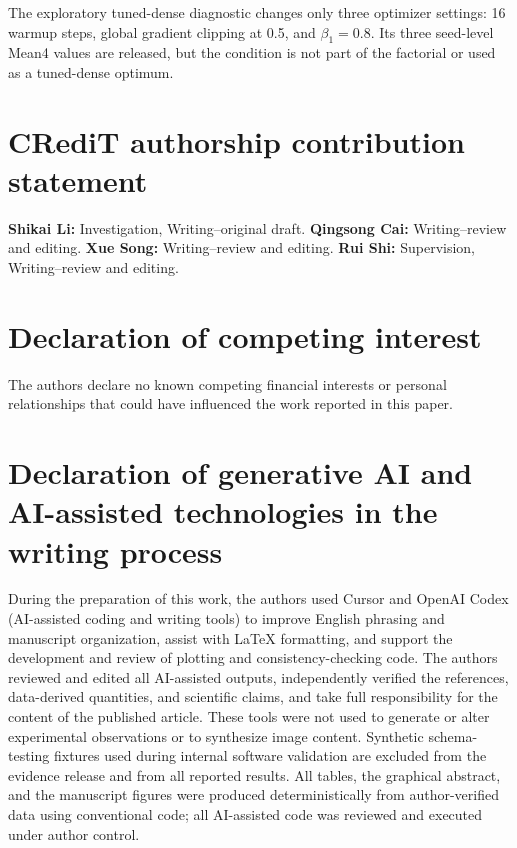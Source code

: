 \documentclass[5p,times]{elsarticle}
\begin{document}
The exploratory tuned-dense diagnostic changes only three optimizer settings:
16 warmup steps, global gradient clipping at 0.5, and $\beta_1=0.8$. Its
three seed-level Mean4 values are released, but the condition is not part of the
factorial or used as a tuned-dense optimum.

\section*{CRediT authorship contribution statement}
\textbf{Shikai Li:} Investigation, Writing--original draft.
\textbf{Qingsong Cai:} Writing--review and editing.
\textbf{Xue Song:} Writing--review and editing.
\textbf{Rui Shi:} Supervision, Writing--review and editing.

\section*{Declaration of competing interest}
The authors declare no known competing financial interests or personal
relationships that could have influenced the work reported in this paper.

\section*{Declaration of generative AI and AI-assisted technologies in the writing process}
During the preparation of this work, the authors used Cursor and OpenAI Codex
(AI-assisted coding and writing tools) to improve English phrasing and
manuscript organization, assist with \LaTeX{} formatting, and support the
development and review of plotting and consistency-checking code. The authors
reviewed and edited all AI-assisted outputs, independently verified the
references, data-derived quantities, and scientific claims, and take full
responsibility for the content of the published article. These tools were not
used to generate or alter experimental observations or to synthesize image
content. Synthetic schema-testing fixtures used during internal software
validation are excluded from the evidence release and from all reported
results. All tables, the graphical abstract, and the manuscript figures were
produced deterministically from author-verified data using conventional code;
all AI-assisted code was reviewed and executed under author control.
\end{document}
